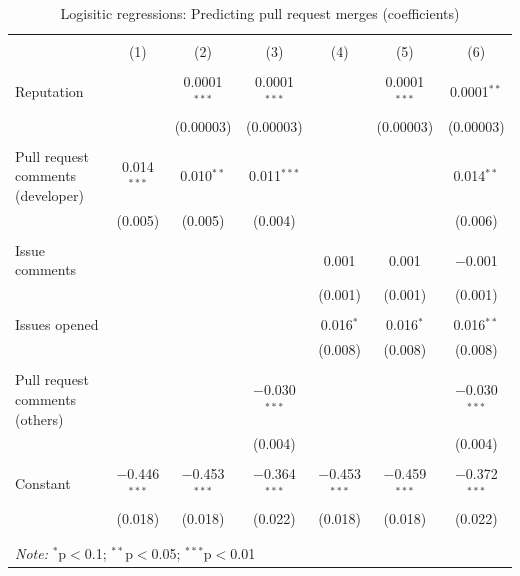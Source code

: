 \documentclass{sigchi}
\begin{document}
\begin{table}[!htbp] \centering 
  \caption{Logisitic regressions: Predicting pull request merges (coefficients)} 
  \label{} 
\begin{tabular}{@{\extracolsep{5pt}}lcccccc} 
\\[-1.8ex]\hline  
\\[-1.8ex] & (1) & (2) & (3) & (4) & (5) & (6)\\ 
\hline \\[-1.8ex] 
 Reputation &  & 0.0001$^{***}$ & 0.0001$^{***}$ &  & 0.0001$^{***}$ & 0.0001$^{**}$ \\ 
  &  & (0.00003) & (0.00003) &  & (0.00003) & (0.00003) \\ 
  & & & & & & \\ 
 Pull request comments (developer) & 0.014$^{***}$ & 0.010$^{**}$ & 0.011$^{***}$ &  &  & 0.014$^{**}$ \\ 
  & (0.005) & (0.005) & (0.004) &  &  & (0.006) \\ 
  & & & & & & \\ 
 Issue comments &  &  &  & 0.001 & 0.001 & $-$0.001 \\ 
  &  &  &  & (0.001) & (0.001) & (0.001) \\ 
  & & & & & & \\ 
 Issues opened &  &  &  & 0.016$^{*}$ & 0.016$^{*}$ & 0.016$^{**}$ \\ 
  &  &  &  & (0.008) & (0.008) & (0.008) \\ 
  & & & & & & \\ 
 Pull request comments (others) &  &  & $-$0.030$^{***}$ &  &  & $-$0.030$^{***}$ \\ 
   &  &  & (0.004) &  &  & (0.004) \\ 
   & & & & & & \\
 Constant & $-$0.446$^{***}$ & $-$0.453$^{***}$ & $-$0.364$^{***}$ & $-$0.453$^{***}$ & $-$0.459$^{***}$ & $-$0.372$^{***}$ \\ 
  & (0.018) & (0.018) & (0.022) & (0.018) & (0.018) & (0.022) \\ 
  & & & & & & \\ 
\hline \\[-1.8ex]  
\multicolumn{7}{l}{\textit{Note:} $^{*}$p$<$0.1; $^{**}$p$<$0.05; $^{***}$p$<$0.01} \\ 
\end{tabular} 
\end{table}
\end{document}
